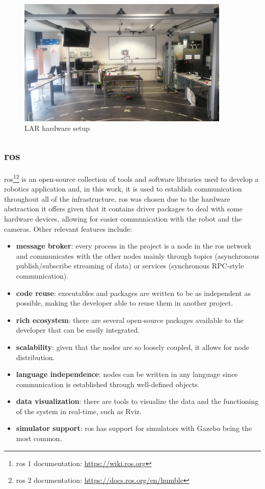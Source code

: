 \begin{figure}[!ht]
\centerline{\includegraphics[width=0.9\textwidth, trim={0 5cm 0 0}, clip]{figs/setup2.jpg}}
\caption[setup]{LAR hardware setup}
\label{fig:LARCC}
\end{figure}
\fi

\subsection{\acf{ros}}

\acs{ros}\cite{ROS2}\footnote{\acs{ros} 1 documentation: \url{https://wiki.ros.org}}\footnote{\acs{ros} 2 documentation: \url{https://docs.ros.org/en/humble}} is an open-source collection of tools and software libraries used to develop a robotics application and, in this work, it is used to establish communication throughout all of the infrastructure. \acs{ros} was chosen due to the hardware abstraction it offers given that it contains driver packages to deal with some hardware devices, allowing for easier communication with the robot and the cameras. Other relevant features include:
\begin{itemize}
    \item \textbf{message broker}: every process in the project is a node in the \acs{ros} network and communicates with the other nodes mainly through topics (asynchronous publish/subscribe streaming of data) or services (synchronous RPC-style communication).
    \item \textbf{code reuse}: executables and packages are written to be as independent as possible, making the developer able to reuse them in another project.
    \item \textbf{rich ecosystem}: there are several open-source packages available to the developer that can be easily integrated.
    \item \textbf{scalability}: given that the nodes are so loosely coupled, it allows for node distribution.
    \item \textbf{language independence}: nodes can be written in any language since communication is established through well-defined objects.
    \item \textbf{data visualization}: there are tools to visualize the data and the functioning of the system in real-time, such as Rviz.
    \item \textbf{simulator support}: \acs{ros} has support for simulators with Gazebo being the most common.
\end{itemize}

